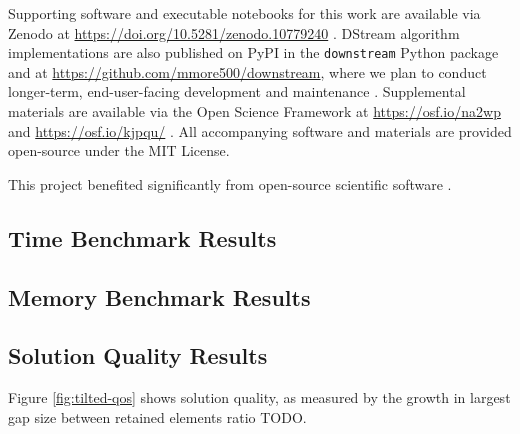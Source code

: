 Supporting software and executable notebooks for this work are available via Zenodo at \url{https://doi.org/10.5281/zenodo.10779240} \citep{moreno2024hsurf}.
DStream algorithm implementations are also published on PyPI in the \texttt{downstream} Python package and at \url{https://github.com/mmore500/downstream}, where we plan to conduct longer-term, end-user-facing development and maintenance \citep{moreno2024downstream}.
Supplemental materials are available via the Open Science Framework at \url{https://osf.io/na2wp} and \url{https://osf.io/kjpqu/} \citep{foster2017open}.
All accompanying software and materials are provided open-source under the MIT License.

This project benefited significantly from open-source scientific software \citep{2020SciPy-NMeth,harris2020array,reback2020pandas,mckinney-proc-scipy-2010,waskom2021seaborn,hunter2007matplotlib,moreno2023teeplot}.


\subsection{Time Benchmark Results}



\subsection{Memory Benchmark Results}




\subsection{Solution Quality Results}




Figure \ref{fig:tilted-qos} shows solution quality, as measured by the growth in largest gap size between retained elements ratio TODO.
